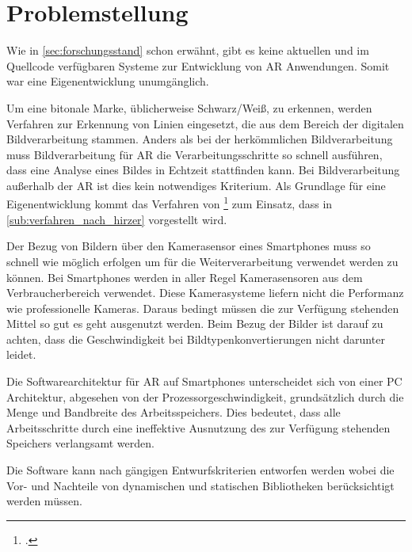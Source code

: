 \section{Problemstellung} %
\label{sec:problemstellung}
\begin{comment}
	Problemstellung: Problemstellung und Frage im Detail erläutern
\end{comment}

Wie in \autoref{sec:forschungsstand} schon erwähnt, gibt es keine aktuellen und im Quellcode verfügbaren Systeme zur Entwicklung von \gls{AR} Anwendungen. Somit war eine Eigenentwicklung unumgänglich.

Um eine bitonale Marke, üblicherweise Schwarz/Weiß, zu erkennen, werden Verfahren zur Erkennung von Linien eingesetzt,
 die aus dem Bereich der digitalen Bildverarbeitung stammen. Anders als bei der herkömmlichen Bildverarbeitung muss
 Bildverarbeitung für \gls{AR} die Verarbeitungsschritte so schnell ausführen, dass eine Analyse eines Bildes in
 Echtzeit stattfinden kann. Bei Bildverarbeitung außerhalb der \gls{AR} ist dies kein notwendiges Kriterium. Als
 Grundlage für eine Eigenentwicklung kommt das Verfahren von \citeauthor{clarke96}\footcite{clarke96} zum Einsatz,
 dass in \autoref{sub:verfahren_nach_hirzer} vorgestellt wird.

Der Bezug von Bildern über den Kamerasensor eines Smartphones muss so schnell wie möglich erfolgen um für die Weiterverarbeitung verwendet werden zu können. Bei Smartphones werden in aller Regel Kamerasensoren aus dem Verbraucherbereich verwendet. Diese Kamerasysteme liefern nicht die Performanz wie professionelle Kameras. Daraus bedingt müssen die zur Verfügung stehenden Mittel so gut es geht ausgenutzt werden. Beim Bezug der Bilder ist darauf zu achten, dass die Geschwindigkeit bei Bildtypenkonvertierungen nicht darunter leidet.

Die Softwarearchitektur für \gls{AR} auf Smartphones unterscheidet sich von einer PC Architektur, abgesehen von der Prozessorgeschwindigkeit, grundsätzlich durch die Menge und Bandbreite des Arbeitsspeichers. Dies bedeutet, dass alle Arbeitsschritte durch eine ineffektive Ausnutzung des zur Verfügung stehenden Speichers verlangsamt werden.

Die Software kann nach gängigen Entwurfskriterien entworfen werden wobei die Vor- und Nachteile von dynamischen und statischen Bibliotheken berücksichtigt werden müs\-sen.

